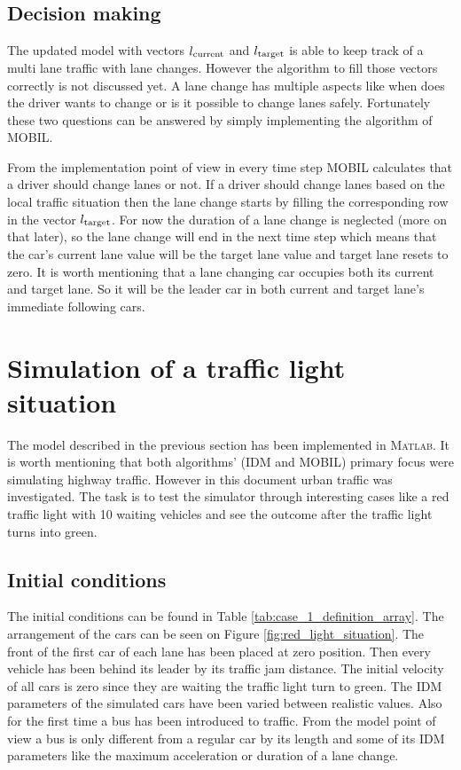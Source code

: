 		\subsection*{Decision making}
		The updated model with vectors $l_{\rm current}$ and $l_{\rm target}$ is able to keep track of a multi lane traffic with lane changes. However the algorithm to fill those vectors correctly is not discussed yet. A lane change has multiple aspects like when does the driver wants to change or is it possible to change lanes safely. Fortunately these two questions can be answered by simply implementing the algorithm of MOBIL.

		From the implementation point of view in every time step MOBIL calculates that a driver should change lanes or not. If a driver should change lanes based on the local traffic situation then the lane change starts by filling the corresponding row in the vector $l_{\rm target}$. For now the duration of a lane change is neglected (more on that later), so the lane change will end in the next time step which means that the car's current lane value will be the target lane value and target lane resets to zero. It is worth mentioning that a lane changing car occupies both its current and target lane. So it will be the leader car in both current and target lane's immediate following cars.
	\section{Simulation of a traffic light situation}
		The model described in the previous section has been implemented in \textsc{Matlab}. It is worth mentioning that both algorithms' (IDM and MOBIL) primary focus were simulating highway traffic. However in this document urban traffic was investigated. The task is to test the simulator through interesting cases like a red traffic light with 10 waiting vehicles and see the outcome after the traffic light turns into green.
		
		\subsection*{Initial conditions}
		The initial conditions can be found in Table \ref{tab:case_1_definition_array}. The arrangement of the cars can be seen on Figure \ref{fig:red_light_situation}. The front of the first car of each lane has been placed at zero position. Then every vehicle has been behind its leader by its traffic jam distance. The initial velocity of all cars is zero since they are waiting the traffic light turn to green. The IDM parameters of the simulated cars have been varied between realistic values. Also for the first time a bus has been introduced to traffic. From the model point of view a bus is only different from a regular car by its length and some of its IDM parameters like the maximum acceleration or duration of a lane change.
		

